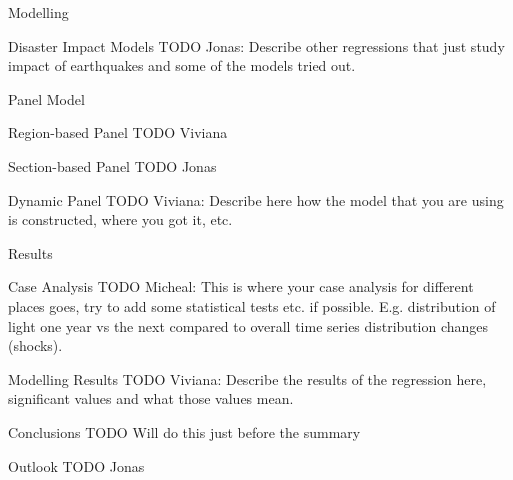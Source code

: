 \documentclass[12pt,fleqn,leqno,letterpaper]{article}
\begin{document}
\begin{section}{Modelling}
  \begin{subsection}{Disaster Impact Models}
    TODO Jonas: Describe other regressions that just study impact of earthquakes and some of the models tried out.
  \end{subsection}
  \begin{subsection}{Panel Model}
    \begin{subsubsection}{Region-based Panel}
      TODO Viviana
    \end{subsubsection}
    \begin{subsubsection}{Section-based Panel}
      TODO Jonas
    \end{subsubsection}
    \begin{subsubsection}{Dynamic Panel}
      TODO Viviana: Describe here how the model that you are using is constructed, where you got it, etc.
    \end{subsubsection}
  \end{subsection}
\end{section}

\begin{section}{Results}
  \begin{subsection}{Case Analysis}
    TODO Micheal: This is where your case analysis for different places goes, try to add some statistical tests etc. if possible. E.g. distribution of light one year vs the next compared to overall time series distribution changes (shocks).
  \end{subsection}
  \begin{subsection}{Modelling Results}
    TODO Viviana: Describe the results of the regression here, significant values and what those values mean.
  \end{subsection}
  \begin{subsection}{Conclusions}
    TODO Will do this just before the summary
  \end{subsection}
  \begin{subsection}{Outlook}
    TODO Jonas
  \end{subsection}
\end{section}


\end{document}
